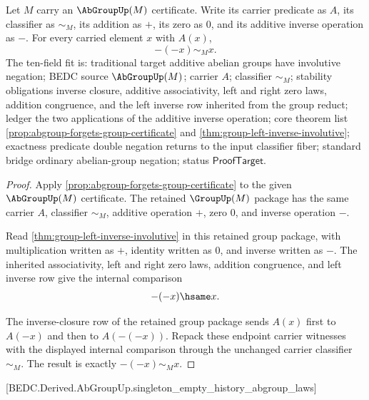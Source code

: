 \begin{theorem}
\label{thm:abgroup-additive-negation-involutive}
Let $M$ carry an $\AbGroupUp(M)$ certificate. Write its carrier predicate as
$A$, its classifier as $\sim_M$, its addition as $+$, its zero as $0$, and its
additive inverse operation as $-$. For every carried element $x$ with $A(x)$,
$$
-(-x)\sim_M x.
$$
The ten-field fit is: traditional target additive abelian groups have
involutive negation; BEDC source $\AbGroupUp(M)$; carrier $A$; classifier
$\sim_M$; stability obligations inverse closure, additive associativity, left
and right zero laws, addition congruence, and the left inverse row inherited
from the group reduct; ledger the two applications of the additive inverse
operation; core theorem list \autoref{prop:abgroup-forgets-group-certificate}
and \autoref{thm:group-left-inverse-involutive}; exactness predicate double
negation returns to the input classifier fiber; standard bridge ordinary
abelian-group negation; status $\mathsf{ProofTarget}$.
\end{theorem}
\begin{proof}
Apply \autoref{prop:abgroup-forgets-group-certificate} to the given
$\AbGroupUp(M)$ certificate. The retained $\GroupUp(M)$ package has the same
carrier $A$, classifier $\sim_M$, additive operation $+$, zero $0$, and inverse
operation $-$.

Read \autoref{thm:group-left-inverse-involutive} in this retained group
package, with multiplication written as $+$, identity written as $0$, and
inverse written as $-$. The inherited associativity, left and right zero laws,
addition congruence, and left inverse row give the internal comparison
$$
-(-x)\hsame x.
$$

The inverse-closure row of the retained group package sends $A(x)$ first to
$A(-x)$ and then to $A(-(-x))$. Repack these endpoint carrier witnesses with
the displayed internal comparison through the unchanged carrier classifier
$\sim_M$. The result is exactly $-(-x)\sim_M x$.
\end{proof}

\begin{closurestatus}{\AbGroupUp}
  \theoryclosure{\scopedClosure}
  \formalstatus{\theoremCheckedV}
\end{closurestatus}

[BEDC.Derived.AbGroupUp.singleton\_empty\_history\_abgroup\_laws]
